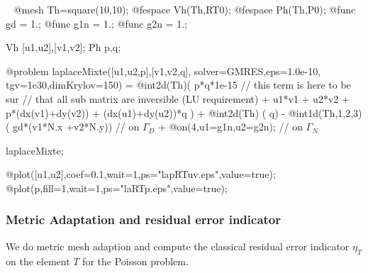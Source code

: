 \documentclass[a4paper,twoside,12pt]{book}
\begin{document}
\begin{example}~
\bFF
@mesh Th=square(10,10);
@fespace Vh(Th,RT0);
@fespace Ph(Th,P0);
@func gd = 1.;
@func g1n = 1.;
@func g2n = 1.;

Vh [u1,u2],[v1,v2];
Ph p,q;

@problem laplaceMixte([u1,u2,p],[v1,v2,q],
                      solver=GMRES,eps=1.0e-10,
                      tgv=1e30,dimKrylov=150)
      =
     @int2d(Th)( p*q*1e-15 // this term is here to be sur
      //  that all sub matrix are inversible (LU requirement)
              + u1*v1 + u2*v2 + p*(dx(v1)+dy(v2)) + (dx(u1)+dy(u2))*q )
  + @int2d(Th) ( q)
  - @int1d(Th,1,2,3)( gd*(v1*N.x +v2*N.y))   //  on  $\Gamma_D$
  + @on(4,u1=g1n,u2=g2n);  // on $\Gamma_N$

 laplaceMixte;

 @plot([u1,u2],coef=0.1,wait=1,ps="lapRTuv.eps",value=true);
 @plot(p,fill=1,wait=1,ps="laRTp.eps",value=true);
\eFF
\end{example}

\subsubsection{Metric Adaptation and residual error indicator}


We do metric mesh adaption and compute the classical
residual error indicator $\eta_{T}$ on the element $T$ for the Poisson problem.
\end{document}

